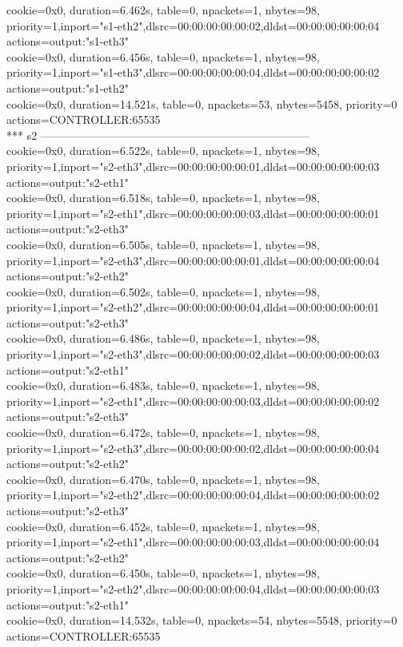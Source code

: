 \documentclass[12pt]{article}
\begin{document}
\begin{enumerate}
    cookie=0x0, duration=6.462s, table=0, npackets=1, nbytes=98, priority=1,inport="s1-eth2",dlsrc=00:00:00:00:00:02,dldst=00:00:00:00:00:04 actions=output:"s1-eth3" \\
    cookie=0x0, duration=6.456s, table=0, npackets=1, nbytes=98, priority=1,inport="s1-eth3",dlsrc=00:00:00:00:00:04,dldst=00:00:00:00:00:02 actions=output:"s1-eth2" \\
    cookie=0x0, duration=14.521s, table=0, npackets=53, nbytes=5458, priority=0 actions=CONTROLLER:65535 \\
    *** s2 ------------------------------------------------------------------------ \\
    cookie=0x0, duration=6.522s, table=0, npackets=1, nbytes=98, priority=1,inport="s2-eth3",dlsrc=00:00:00:00:00:01,dldst=00:00:00:00:00:03 actions=output:"s2-eth1" \\
    cookie=0x0, duration=6.518s, table=0, npackets=1, nbytes=98, priority=1,inport="s2-eth1",dlsrc=00:00:00:00:00:03,dldst=00:00:00:00:00:01 actions=output:"s2-eth3" \\
    cookie=0x0, duration=6.505s, table=0, npackets=1, nbytes=98, priority=1,inport="s2-eth3",dlsrc=00:00:00:00:00:01,dldst=00:00:00:00:00:04 actions=output:"s2-eth2" \\
    cookie=0x0, duration=6.502s, table=0, npackets=1, nbytes=98, priority=1,inport="s2-eth2",dlsrc=00:00:00:00:00:04,dldst=00:00:00:00:00:01 actions=output:"s2-eth3" \\
    cookie=0x0, duration=6.486s, table=0, npackets=1, nbytes=98, priority=1,inport="s2-eth3",dlsrc=00:00:00:00:00:02,dldst=00:00:00:00:00:03 actions=output:"s2-eth1" \\
    cookie=0x0, duration=6.483s, table=0, npackets=1, nbytes=98, priority=1,inport="s2-eth1",dlsrc=00:00:00:00:00:03,dldst=00:00:00:00:00:02 actions=output:"s2-eth3" \\
    cookie=0x0, duration=6.472s, table=0, npackets=1, nbytes=98, priority=1,inport="s2-eth3",dlsrc=00:00:00:00:00:02,dldst=00:00:00:00:00:04 actions=output:"s2-eth2" \\
    cookie=0x0, duration=6.470s, table=0, npackets=1, nbytes=98, priority=1,inport="s2-eth2",dlsrc=00:00:00:00:00:04,dldst=00:00:00:00:00:02 actions=output:"s2-eth3" \\
    cookie=0x0, duration=6.452s, table=0, npackets=1, nbytes=98, priority=1,inport="s2-eth1",dlsrc=00:00:00:00:00:03,dldst=00:00:00:00:00:04 actions=output:"s2-eth2" \\
    cookie=0x0, duration=6.450s, table=0, npackets=1, nbytes=98, priority=1,inport="s2-eth2",dlsrc=00:00:00:00:00:04,dldst=00:00:00:00:00:03 actions=output:"s2-eth1" \\
    cookie=0x0, duration=14.532s, table=0, npackets=54, nbytes=5548, priority=0 actions=CONTROLLER:65535

\end{enumerate}
\end{document}

